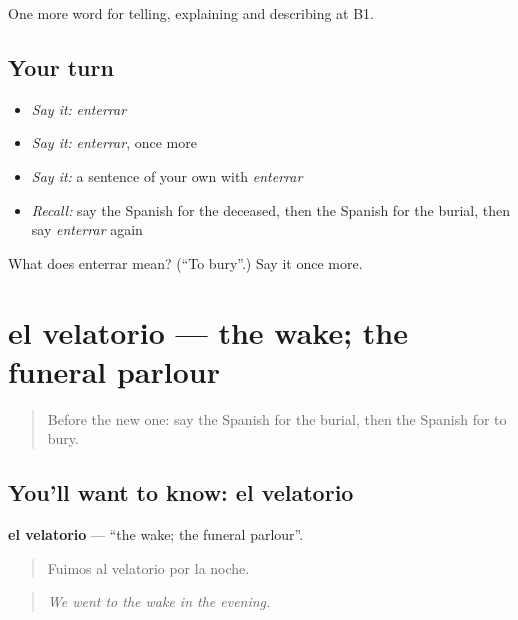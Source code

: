 \begin{grammarlens}[title={What you've built}]
One more word for telling, explaining and describing at B1.
\end{grammarlens}

\subsection*{Your turn}
\begin{itemize}
\raggedright
  \item \emph{Say it:} \emph{enterrar}
  \item \emph{Say it:} \emph{enterrar}, once more
  \item \emph{Say it:} a sentence of your own with \emph{enterrar}
  \item \emph{Recall:} say the Spanish for the deceased, then the Spanish for the burial, then say \emph{enterrar} again
\end{itemize}

\begin{tcolorbox}[breakable,colback=teal!4,colframe=teal!35!black,title={Before you move on}]
What does enterrar mean? (\textquotedblleft{}To bury\textquotedblright{}.) Say it once more.
\end{tcolorbox}
\section[el velatorio]{el velatorio — the wake; the funeral parlour}

\label{lesson:ES-C556-velatorio}



\begin{quote}
Before the new one: say the Spanish for the burial, then the Spanish for to bury.
\end{quote}

\subsection*{You'll want to know: el velatorio}
\textbf{el velatorio} — \textquotedblleft{}the wake; the funeral parlour\textquotedblright{}.

\begin{quote}
Fuimos al velatorio por la noche.
\end{quote}

\begin{quote}
\emph{We went to the wake in the evening.}
\end{quote}

